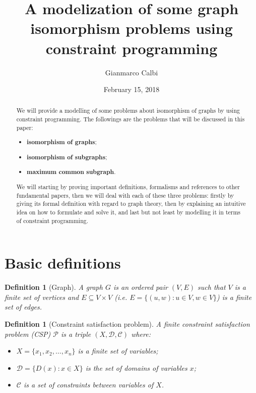 \documentclass[a4paper,12pt]{article}
\title{A modelization of some graph isomorphism problems using constraint programming}
\author{Gianmarco Calbi}
\date{February 15, 2018}
\theoremstyle{newplanestyle}
\theoremstyle{newdefinitionstyle}
\newtheorem{newdef}[newtheo]{Definition}
\theoremstyle{newprovestyle}
\begin{document}
\maketitle
\cleardoublepage

\tableofcontents
\cleardoublepage

\begin{abstract}
	We will provide a modelling of some problems about isomorphism of graphs by using constraint programming. The followings are the problems that will be discussed in this paper:
	\begin{itemize}[noitemsep]
		\item \textbf{isomorphism of graphs};
		\item \textbf{isomorphism of subgraphs};
		\item \textbf{maximum common subgraph}.
	\end{itemize}
	We will starting by proving important definitions, formalisms and references to other fundamental papers, then we will deal with each of these three problems: firstly by giving its formal definition with regard to graph theory, then by explaining an intuitive idea on how to formulate and solve it, and last but not least by modelling it in terms of constraint programming.
\end{abstract}

\cleardoublepage

\section{Basic definitions}

\begin{newdef}[Graph]
	A \textit{graph} $G$ is an ordered pair $(V,E)$ such that $V$ is a finite set of vertices and $E \subseteq V \times V$ (i.e. $E = \{(u,w) : u \in V, w \in V\}$) is a finite set of edges.
\end{newdef}

\begin{newdef}[Constraint satisfaction problem]
	A finite \textit{constraint satisfaction problem} (CSP) $\mathcal{P}$ is a triple $(X, \mathcal{D}, \mathcal{C})$ where:
	\begin{itemize}[noitemsep]
		\item $X = \{x_1, x_2, \dots, x_n\}$ is a finite set of variables;
		\item $\mathcal{D} = \{D(x) : x \in X\}$ is the set of domains of variables $x$;
		\item $\mathcal{C}$ is a set of constraints between variables of $X$. 
	\end{itemize}
\end{newdef}
\end{document}
